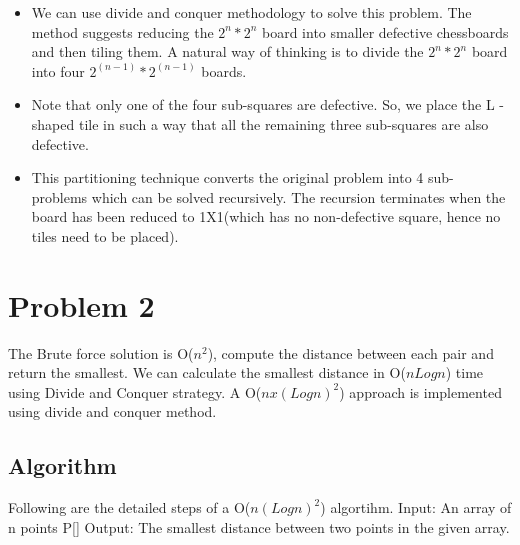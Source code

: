 \documentclass[12pt]{article}
\begin{document}
\begin{itemize}
    \item We can use divide and conquer methodology to solve this problem. The method suggests reducing the \begin{math}2^n * 2^n
    \end{math}  board into smaller defective chessboards and then tiling them. A natural way of thinking is to divide the \begin{math}2^n * 2^n
    \end{math} 
    board into four 
    \begin{math}2^(n-1) * 2^(n-1)
    \end{math} 
    boards.
    \item Note that only one of the four sub-squares are defective. So, we place the L  - shaped tile in such a way that all the remaining three sub-squares are also defective.
    \item This partitioning technique converts the original problem into 4 sub- problems which can be solved recursively. The recursion terminates when the board has been reduced to 1X1(which has no non-defective square, hence no tiles need to be placed).

\end{itemize}




	
	



\section*{Problem 2}

The Brute force solution is O(\begin{math}n^2
\end{math}), compute the distance between each pair and return the smallest. We can calculate the smallest distance in O(\begin{math}nLogn
\end{math}) time using Divide and Conquer strategy. A O(\begin{math}n x (Logn)^2\end{math}) approach is implemented using divide and conquer method.

\subsection*{Algorithm}

Following are the detailed steps of a O(\begin{math}n (Logn)^2\end{math}) algortihm.
Input: An array of n points P[]
Output: The smallest distance between two points in the given array.
\end{document}
